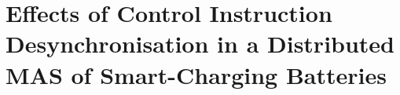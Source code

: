 \chapter{Effects of Control Instruction Desynchronisation in a Distributed MAS of Smart-Charging Batteries}
\label{ch3}



